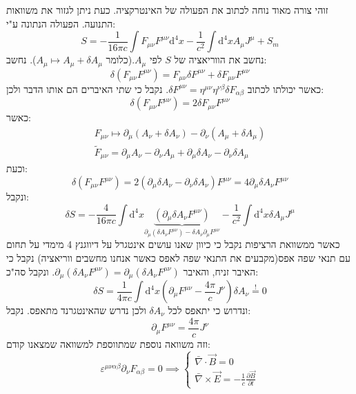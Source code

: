 \documentclass{tstextbook}
\begin{document}
זוהי צורה מאוד נוחה לכתוב את הפעולה של האינטרקציה. כעת ניתן לגזור את משוואות התנועה.
הפעולה הנתונה ע"י:
$$S=-\frac{1}{16\pi c} \int F_{\mu \nu} F^{\mu \nu} \mathrm{d}^4x-\frac{1}{c^2}\int\mathrm{d^4}x A_{\mu}J^\mu +S_{m}$$
נחשב את הווריאציה של \(S\) לפי \(A_{\mu}\).(כלומר \(A_{\mu}\mapsto A_{\mu}+\delta A_{\mu}\)). נחשב:
$$\delta\left( F_{\mu \nu}F^{\mu \nu} \right)=F_{\mu \nu}\delta F^{\mu \nu}+\delta F_{\mu \nu}F^{\mu \nu}$$
כאשר יכולתו לכתוב \(\delta F^{\mu \nu}=\eta^{\mu \nu}\eta^{\nu \beta}\delta F_{\alpha \beta}\). נקבל כי שתי האיברים הם אותו הדבר ולכן:
$$\delta\left( F_{\mu \nu}F^{\mu \nu} \right)=2\delta F_{\mu \nu}F^{\mu \nu}$$
כאשר:
$$\begin{gather}F_{\mu \nu}\mapsto \partial_{\mu}\left( A_{\nu}+\delta A_{\nu} \right)-\partial_{\nu}\left( A_{\mu}+\delta A_{\mu} \right)  \\\tilde{F}_{\mu \nu}=\partial_{\mu} A_{\nu}-\partial_{\nu} A_{\mu}+\partial_{\mu}\delta A_{\nu}-\partial_{\nu}\delta A_{\mu}
\end{gather}$$
וכעת:
$$\delta\left( F_{\mu \nu}F^{\mu \nu} \right)= 2 \left( \partial_{\mu}\delta A_{\nu}-\partial_{\nu}\delta A_{\nu} \right) F^{\mu \nu}=4\partial_{\mu}\delta A_{\nu}F^{\mu \nu}$$
ונקבל:
$$\delta S= -\frac{4}{16\pi c} \int \mathrm{d}^4x\underbrace{ \left( \partial_{\mu}\delta A_{\nu}F^{\mu \nu} \right) }_{ \partial_{\mu}\left( \delta A_{\nu }F^{\mu \nu} \right)-\delta A_{\nu}\partial_{\mu}F^{\mu \nu} }-\frac{1}{c^2}\int \mathrm{d}^4x \delta A_{\mu}J^\mu$$
כאשר ממשוואת הרציפות נקבל כי כיוון שאנו עושים אינטגרל על דיווגנץ 4 מימדי על תחום עם תנאי שפה אפס(מקבעים את התנאי שפה לאפס כאשר אנחנו מחשבים ווריאציה) נקבל כי האיבר זניח, והאיבר \(\partial_{\mu}\left( \delta A_{\nu }F^{\mu \nu} \right)=\partial_{\mu}\left( \delta A_{\nu}F^{\mu \nu} \right)\). ונקבל סה"כ:
$$\delta S = \frac{1}{4\pi c}\int \mathrm{d}^4 x \left( \partial_{\mu} F^{\mu \nu}-\frac{4\pi}{c} J^\nu \right)\delta A_{\nu}\overset{!}{=} 0$$
ונדרוש כי יתאפס לכל \(\delta A_{\nu}\) ולכן נדרש שהאינטגרנד מתאפס. נקבל:
$$\boxed{\partial_{\mu}F^{\mu \nu}=\frac{4\pi}{c}J^{\nu}}
$$
וזה משוואה נוספת שמתווספת למשוואה שמצאנו קודם:
$$\varepsilon^{\mu \nu \alpha \beta}\partial_{\nu}F_{\alpha \beta}=0\implies \begin{cases}\bar{\nabla} \cdot \vec{B} = 0 \\\bar{\nabla} \times \vec{E} = -\frac{1}{c} \frac{\partial \vec{B}}{\partial t} 
\end{cases}$$
\end{document}
